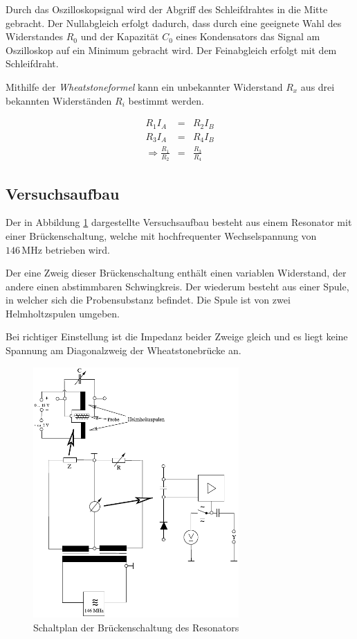 \documentclass[12pt,a4paper]{scrartcl}
\numberwithin{equation}{section} %
\begin{document}
Durch das Oszilloskopsignal wird der Abgriff des Schleifdrahtes in die Mitte gebracht. Der Nullabgleich erfolgt dadurch, dass durch eine geeignete Wahl des Widerstandes $R_0$ und der Kapazität $C_0$ eines Kondensators das Signal am Oszilloskop auf ein Minimum gebracht wird. Der Feinabgleich erfolgt mit dem Schleifdraht.

Mithilfe der \emph{Wheatstoneformel} kann ein unbekannter Widerstand $R_x$ aus drei bekannten Widerständen $R_i$ bestimmt werden.

\begin{eqnarray}
    R_1 I_A &=& R_2 I_B \\
    R_3 I_A &=& R_4 I_B \\
    \Rightarrow \frac{R_1}{R_2} &=& \frac{R_3}{R_4}
\end{eqnarray}

\hypertarget{Versuchsaufbau}{\subsection{Versuchsaufbau}\label{Versuchsaufbau}}
Der in Abbildung \ref{fig:aufbau} dargestellte Versuchsaufbau besteht aus einem Resonator mit einer Brückenschaltung, welche mit hochfrequenter Wechselspannung von $146 \mathrm{\, MHz}$ betrieben wird.

Der eine Zweig dieser Brückenschaltung enthält einen variablen Widerstand, der andere einen abstimmbaren Schwingkreis. Der wiederum besteht aus einer Spule, in welcher sich die Probensubstanz befindet. Die Spule ist von zwei Helmholtzspulen umgeben.

Bei richtiger Einstellung ist die Impedanz beider Zweige gleich und es liegt keine Spannung am Diagonalzweig der Wheatstonebrücke an.

\begin{figure}[h!]
	\centering
	\includegraphics[width=0.7\textwidth]{../media/B1.5/Aufbau.pdf}
	\caption{Schaltplan der Brückenschaltung des Resonators \cite{Uni}}
	\label{fig:aufbau}
\end{figure}
\end{document}
